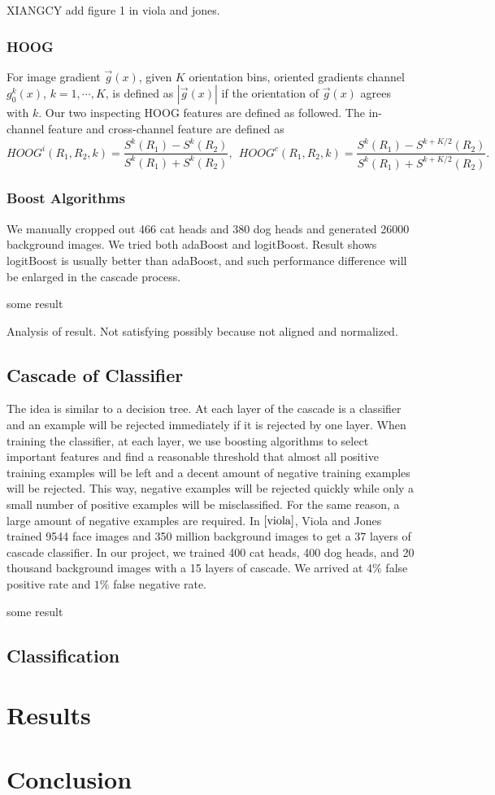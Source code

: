 \documentclass[12pt]{article}
\begin{document}
XIANGCY add figure 1 in viola and jones.

\subsubsection{HOOG}
For image gradient $\vec{g}(x)$, given $K$ orientation bins, oriented gradients channel $g^k_0(x)$, $k = 1, \cdots, K$, is defined as $|\vec{g}(x)|$ if the orientation of $\vec{g}(x)$ agrees with $k$. Our two inspecting HOOG features are defined as followed. The in-channel feature and cross-channel feature are defined as 
\[HOOG^i(R_1,R_2, k) = \frac{S^k(R_1) - S^k(R_2)}{S^k(R_1) + S^k(R_2)}, ~~HOOG^c(R_1,R_2, k) = \frac{S^k(R_1) - S^{k+K/2}(R_2)}{S^k(R_1) + S^{k+K/2}(R_2)}.\]
\subsubsection{Boost Algorithms}
We manually cropped out 466 cat heads and 380 dog heads and generated 26000 background images. We tried both adaBoost and logitBoost. Result shows logitBoost is usually better than adaBoost, and such performance difference will be enlarged in the cascade process.

some result

Analysis of result. Not satisfying possibly because not aligned and normalized.
\subsection{Cascade of Classifier}
The idea is similar to a decision tree. At each layer of the cascade is a classifier and an example will be rejected immediately if it is rejected by one layer. When training the classifier, at each layer, we use boosting algorithms to select important features and find a reasonable threshold that almost all positive training examples will be left and a decent amount of negative training examples will be rejected. This way, negative examples will be rejected quickly while only a small number of positive examples will be misclassified. For the same reason, a large amount of negative examples are required. In $\cite{viola}$, Viola and Jones trained 9544 face images and 350 million background images to get a 37 layers of cascade classifier. In our project, we trained 400 cat heads, 400 dog heads, and 20 thousand background images with a 15 layers of cascade. We arrived at 4$\%$ false positive rate and $1\%$ false negative rate.   

some result

\subsection{Classification}

\section{Results}

\section{Conclusion}

\begin{thebibliography}{99}
\end{thebibliography}
\end{document}
